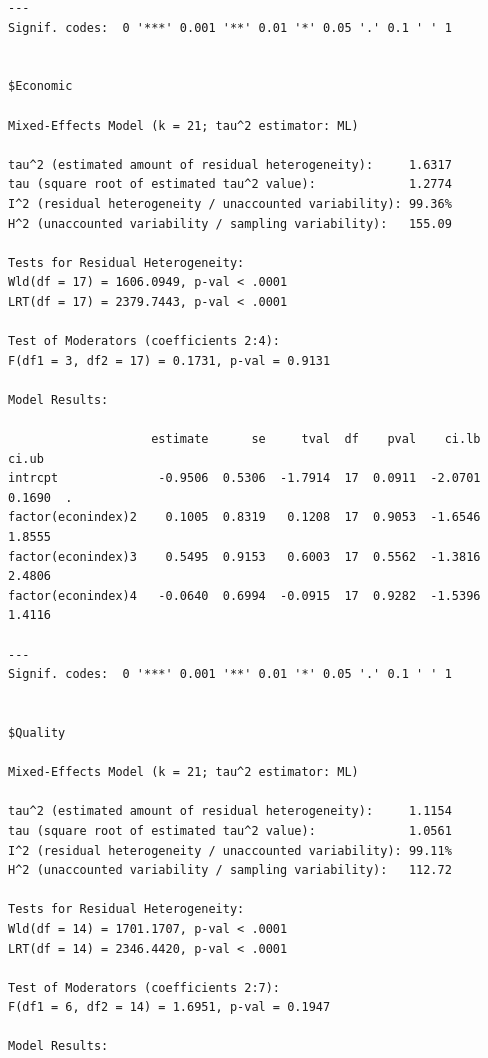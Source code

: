 \documentclass[
  letterpaper,
  DIV=11,
  numbers=noendperiod]{scrartcl}
\begin{document}
\begin{verbatim}
---
Signif. codes:  0 '***' 0.001 '**' 0.01 '*' 0.05 '.' 0.1 ' ' 1


$Economic

Mixed-Effects Model (k = 21; tau^2 estimator: ML)

tau^2 (estimated amount of residual heterogeneity):     1.6317
tau (square root of estimated tau^2 value):             1.2774
I^2 (residual heterogeneity / unaccounted variability): 99.36%
H^2 (unaccounted variability / sampling variability):   155.09

Tests for Residual Heterogeneity:
Wld(df = 17) = 1606.0949, p-val < .0001
LRT(df = 17) = 2379.7443, p-val < .0001

Test of Moderators (coefficients 2:4):
F(df1 = 3, df2 = 17) = 0.1731, p-val = 0.9131

Model Results:

                    estimate      se     tval  df    pval    ci.lb   ci.ub    
intrcpt              -0.9506  0.5306  -1.7914  17  0.0911  -2.0701  0.1690  . 
factor(econindex)2    0.1005  0.8319   0.1208  17  0.9053  -1.6546  1.8555    
factor(econindex)3    0.5495  0.9153   0.6003  17  0.5562  -1.3816  2.4806    
factor(econindex)4   -0.0640  0.6994  -0.0915  17  0.9282  -1.5396  1.4116    

---
Signif. codes:  0 '***' 0.001 '**' 0.01 '*' 0.05 '.' 0.1 ' ' 1


$Quality

Mixed-Effects Model (k = 21; tau^2 estimator: ML)

tau^2 (estimated amount of residual heterogeneity):     1.1154
tau (square root of estimated tau^2 value):             1.0561
I^2 (residual heterogeneity / unaccounted variability): 99.11%
H^2 (unaccounted variability / sampling variability):   112.72

Tests for Residual Heterogeneity:
Wld(df = 14) = 1701.1707, p-val < .0001
LRT(df = 14) = 2346.4420, p-val < .0001

Test of Moderators (coefficients 2:7):
F(df1 = 6, df2 = 14) = 1.6951, p-val = 0.1947

Model Results:


\end{verbatim}
\end{document}
